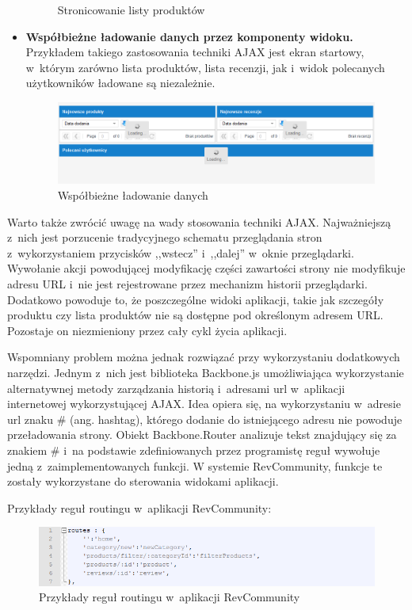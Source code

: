 \begin{itemize}
\begin{figure}[H]
	\caption{Stronicowanie listy produktów}
\end{figure}
\item\textbf{Współbieżne ładowanie danych przez komponenty widoku.} Przykładem takiego zastosowania techniki AJAX jest ekran startowy, w~którym zarówno lista produktów, lista recenzji, jak i~widok polecanych użytkowników ładowane są niezależnie.
\begin{figure}[H]
	\centering
	\includegraphics[width=\textwidth]{images/Loading.png}
	\caption{Współbieżne ładowanie danych}
\end{figure}
\end{itemize}


Warto także zwrócić uwagę na wady stosowania techniki AJAX. Najważniejszą z~nich jest porzucenie tradycyjnego schematu przeglądania stron z~wykorzystaniem przycisków ,,wstecz'' i~,,dalej'' w~oknie przeglądarki. Wywołanie akcji powodującej modyfikację części zawartości strony nie modyfikuje adresu URL i~nie jest rejestrowane przez mechanizm historii przeglądarki. Dodatkowo powoduje to, że poszczególne widoki aplikacji, takie jak szczegóły produktu czy lista produktów nie są dostępne pod określonym adresem URL. Pozostaje on niezmieniony przez cały cykl życia aplikacji.\cite{jsadv}

Wspomniany problem można jednak rozwiązać przy wykorzystaniu dodatkowych narzędzi. Jednym z~nich jest biblioteka Backbone.js umożliwiająca wykorzystanie alternatywnej metody zarządzania historią i~adresami url w~aplikacji internetowej wykorzystującej AJAX. Idea opiera się, na wykorzystaniu w~adresie url znaku \# (ang. hashtag), którego dodanie do istniejącego adresu nie powoduje przeładowania strony.\cite{urls} Obiekt Backbone.Router analizuje tekst znajdujący się za znakiem \# i~na podstawie zdefiniowanych przez programistę reguł wywołuje jedną z~zaimplementowanych funkcji. W systemie RevCommunity, funkcje te zostały wykorzystane do sterowania widokami aplikacji.\cite{backbone}

Przykłady reguł routingu w~aplikacji RevCommunity:

\begin{figure}[H]
	\centering
	\includegraphics[width=\textwidth]{images/routes.png}
	\caption{Przykłady reguł routingu w~aplikacji RevCommunity}
\end{figure}

